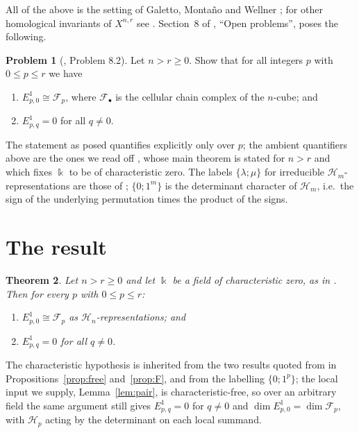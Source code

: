 \documentclass[11pt]{amsart}
\newtheorem{theorem}{Theorem}[section]
\theoremstyle{definition}
\newtheorem{problem}[theorem]{Problem}
\theoremstyle{remark}
\newcommand{\kk}{\Bbbk}
\newcommand{\Hy}{\mathcal H}
\newcommand{\Fc}{\mathcal F}
\newcommand{\bl}{\bullet}
\numberwithin{equation}{section}
\begin{document}
All of the above is the setting of Galetto, Monta\~no and Wellner \cite{GMW};
for other homological invariants of $X^{n,r}$ see \cite{BEG}. Section~8 of
\cite{GMW}, ``Open problems'', poses the following.

\begin{problem}[\cite{GMW}, Problem 8.2]\label{prob:82}
Let $n>r\ge0$. Show that for all integers $p$ with $0\le p\le r$ we have
\begin{enumerate}
\item[(i)] $E^1_{p,0}\cong\Fc_p$, where $\Fc_\bl$ is the cellular chain complex
  of the $n$-cube; and
\item[(ii)] $E^1_{p,q}=0$ for all $q\neq0$.
\end{enumerate}
\end{problem}

The statement as posed quantifies explicitly only over $p$; the ambient
quantifiers above are the ones we read off \cite{GMW}, whose main theorem is
stated for $n>r$ and which fixes $\kk$ to be of characteristic zero. The labels
$\{\lambda;\mu\}$ for irreducible $\Hy_m$-representations are those of
\cite{GMW}; $\{0;1^m\}$ is the determinant character of $\Hy_m$, i.e.\ the sign
of the underlying permutation times the product of the signs.

\section{The result}\label{sec:result}

\begin{theorem}\label{thm:main}
Let $n>r\ge0$ and let $\kk$ be a field of characteristic zero, as in
\cite{GMW}. Then for every $p$ with $0\le p\le r$:
\begin{enumerate}
\item[(i)] $E^1_{p,0}\cong\Fc_p$ as $\Hy_n$-representations; and
\item[(ii)] $E^1_{p,q}=0$ for all $q\neq0$.
\end{enumerate}
\end{theorem}

The characteristic hypothesis is inherited from the two results quoted from
\cite{GMW} in Propositions~\ref{prop:free} and~\ref{prop:F}, and from the
labelling $\{0;1^p\}$; the local input we supply, Lemma~\ref{lem:pair}, is
characteristic-free, so over an arbitrary field the same argument still gives
$E^1_{p,q}=0$ for $q\neq0$ and $\dim E^1_{p,0}=\dim\Fc_p$, with $\Hy_p$ acting
by the determinant on each local summand.
\end{document}
